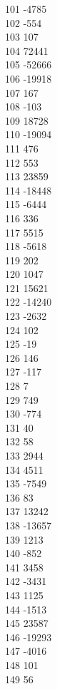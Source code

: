 { 101	-4785 \\
 102	-554 \\
 103	107 \\
 104	72441 \\
 105	-52666 \\
 106	-19918 \\
 107	167 \\
 108	-103 \\
 109	18728 \\
 110	-19094 \\
 111	476 \\
 112	553 \\
 113	23859 \\
 114	-18448 \\
 115	-6444 \\
 116	336 \\
 117	5515 \\
 118	-5618 \\
 119	202 \\
 120	1047 \\
 121	15621 \\
 122	-14240 \\
 123	-2632 \\
 124	102 \\
 125	-19 \\
 126	146 \\
 127	-117 \\
 128	7 \\
 129	749 \\
 130	-774 \\
 131	40 \\
 132	58 \\
 133	2944 \\
 134	4511 \\
 135	-7549 \\
 136	83 \\
 137	13242 \\
 138	-13657 \\
 139	1213 \\
 140	-852 \\
 141	3458 \\
 142	-3431 \\
 143	1125 \\
 144	-1513 \\
 145	23587 \\
 146	-19293 \\
 147	-4016 \\
 148	101 \\
 149	56 \\
}
